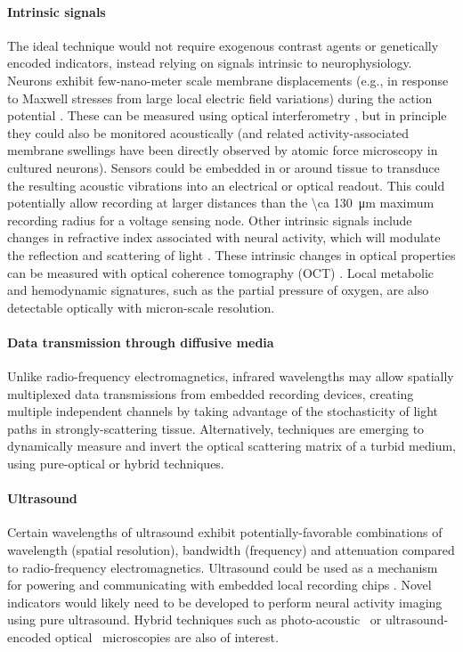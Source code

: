 \paragraph{Intrinsic signals} The ideal technique would not require exogenous contrast agents or genetically encoded indicators, instead relying on signals intrinsic to neurophysiology. Neurons exhibit few-nano-meter scale \cite{iwasa1980swelling} membrane displacements (e.g., in response to Maxwell stresses from large local electric field variations) during the action potential \cite{oh2012label}. These can be measured using optical interferometry \cite{fang2004noncontact}, but in principle they could also be monitored acoustically (and related activity-associated membrane swellings have been directly observed by atomic force microscopy \cite{kim2007mechanical} in cultured neurons). Sensors could be embedded in or around tissue to transduce the resulting acoustic vibrations into an electrical or optical readout. This could potentially allow recording at larger distances than the \SI{\ca 130}{\micro\meter} maximum recording radius for a voltage sensing node. Other intrinsic signals include changes in refractive index associated with neural activity, which will modulate the reflection and scattering of light \cite{stepnoski1991noninvasive}. These intrinsic changes in optical properties can be measured with optical coherence tomography (OCT) \cite{lazebnik2003functional}. Local metabolic  and hemodynamic signatures, such as the partial pressure of oxygen, are also detectable optically \cite{parpaleix2013imaging, lecoq2011simultaneous} with micron-scale resolution. 

\paragraph{Data transmission through diffusive media} Unlike radio-frequency electromagnetics, infrared wavelengths may allow spatially multiplexed data transmissions from embedded recording devices, creating multiple independent channels by taking advantage of the stochasticity of light paths in strongly-scattering tissue. Alternatively, techniques are emerging to dynamically measure and invert the optical scattering matrix of a turbid medium, using pure-optical or hybrid techniques.

\paragraph{Ultrasound} Certain wavelengths of ultrasound exhibit potentially-favorable combinations of wavelength (spatial resolution), bandwidth (frequency) and attenuation compared to radio-frequency electromagnetics. Ultrasound could be used as a mechanism for powering and communicating with embedded local recording chips \cite{Seo2013}. Novel indicators \cite{ShapiroGasNanostructures} would likely need to be developed to perform neural activity imaging using pure ultrasound. Hybrid techniques such as photo-acoustic~\cite{filonov12} or ultrasound-encoded optical~\cite{wang12} microscopies are also of interest.

